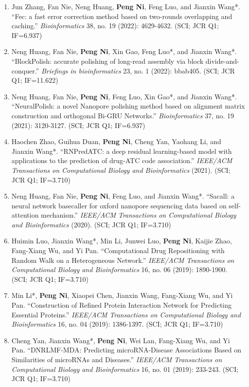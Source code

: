 \documentclass{resume}
\begin{document}
\begin{itemize}
\begin{enumerate}
    \item Jun Zhang, Fan Nie, Neng Huang, \textbf{Peng Ni}, Feng Luo, and Jianxin Wang*. \enquote{Fec: a fast error correction method based on two-rounds overlapping and caching.} {\it Bioinformatics} 38, no. 19 (2022): 4629-4632. (SCI; JCR Q1; IF=6.937)
    \item Neng Huang, Fan Nie, \textbf{Peng Ni}, Xin Gao, Feng Luo*, and Jianxin Wang*. \enquote{BlockPolish: accurate polishing of long-read assembly via block divide-and-conquer.} {\it Briefings in bioinformatics} 23, no. 1 (2022): bbab405. (SCI; JCR Q1; IF=11.622)
    \item Neng Huang, Fan Nie, \textbf{Peng Ni}, Feng Luo, Xin Gao*, and Jianxin Wang*. \enquote{NeuralPolish: a novel Nanopore polishing method based on alignment matrix construction and orthogonal Bi-GRU Networks.} {\it Bioinformatics} 37, no. 19 (2021): 3120-3127. (SCI; JCR Q1; IF=6.937)
    \item Haochen Zhao, Guihua Duan, \textbf{Peng Ni}, Cheng Yan, Yaohang Li, and Jianxin Wang*. \enquote{RNPredATC: a deep residual learning-based model with applications to the prediction of drug-ATC code association.} {\it IEEE/ACM Transactions on Computational Biology and Bioinformatics} (2021). (SCI; JCR Q1; IF=3.710)
    \item Neng Huang, Fan Nie, \textbf{Peng Ni}, Feng Luo, and Jianxin Wang*. \enquote{Sacall: a neural network basecaller for oxford nanopore sequencing data based on self-attention mechanism.} {\it IEEE/ACM Transactions on Computational Biology and Bioinformatics} (2020). (SCI; JCR Q1; IF=3.710)
    \item Huimin Luo, Jianxin Wang*, Min Li, Junwei Luo, \textbf{Peng Ni}, Kaijie Zhao, Fang-Xiang Wu, and Yi Pan. \enquote{Computational Drug Repositioning with Random Walk on a Heterogeneous Network.} {\it IEEE/ACM Transactions on Computational Biology and Bioinformatics} 16, no. 06 (2019): 1890-1900. (SCI; JCR Q1; IF=3.710)
    \item Min Li*, \textbf{Peng Ni}, Xiaopei Chen, Jianxin Wang, Fang-Xiang Wu, and Yi Pan. \enquote{Construction of Refined Protein Interaction Network for Predicting Essential Proteins.} {\it IEEE/ACM Transactions on Computational Biology and Bioinformatics} 16, no. 04 (2019): 1386-1397. (SCI; JCR Q1; IF=3.710)
    \item Cheng Yan, Jianxin Wang*, \textbf{Peng Ni}, Wei Lan, Fang-Xiang Wu, and Yi Pan. \enquote{DNRLMF-MDA: Predicting microRNA-Disease Associations Based on Similarities of microRNAs and Diseases.} {\it IEEE/ACM Transactions on Computational Biology and Bioinformatics} 16, no. 01 (2019): 233-243. (SCI; JCR Q1; IF=3.710)
  \end{enumerate}
\end{itemize}
\end{document}
